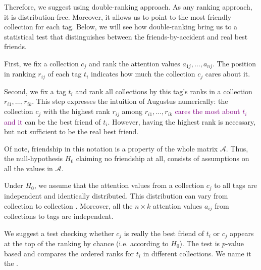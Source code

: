 \documentclass{llncs}
\begin{document}

Therefore, we suggest using double-ranking approach. As any ranking approach, it is distribution-free. Moreover, it allows us to point to the most friendly collection for each tag. Below, we will see how double-ranking bring us to a statistical test that distinguishes between the friends-by-accident and real best friends.


First, we fix a collection $c_j$ and rank the attention values $a_{1j}, \dots, a_{nj}$. The position in ranking $r_{ij}$ of each tag $t_i$ indicates how much the collection $c_j$ cares about it. 



Second, we fix a tag $t_i$ and rank all collections by this tag's ranks in a collection $r_{i1}, \dots, r_{ik}$.
This step expresses the intuition of Augustus numerically: the collection $c_j$ with the highest rank $r_{ij}$ among $r_{i1}, \dots, r_{ik}$ 
 \textcolor{purple}{cares the most about $t_i$ and it }can be the best friend of $t_i$. However, having the highest rank is necessary, but not sufficient to be the real best friend. 



Of note, friendship in this notation is a property of the whole matrix $\mathcal{A}$. Thus, the null-hypothesis $H_0$ claiming no friendship at all, consists of assumptions on all the values in $\mathcal{A}$.

Under $H_0$, we assume that the attention values from a collection $c_j$ to all tags are independent and identically distributed.
This distribution can vary from collection  to collection . Moreover, all the $n \times k$ attention values $a_{ij}$ from collections to tags are independent.

We suggest a test checking whether $c_j$ is really the best friend of $t_i$ or $c_j$ appears at the top of the ranking by chance (i.e. according to $H_0$). The test is $p$-value based and compares the ordered ranks for $t_i$ in different collections. We name it the .
\end{document}
